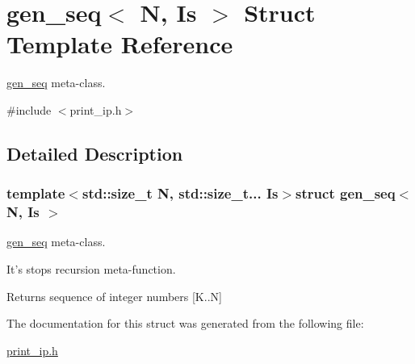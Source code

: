 \hypertarget{structgen__seq}{\section{gen\-\_\-seq$<$ N, Is $>$ Struct Template Reference}
\label{structgen__seq}
}


\hyperlink{structgen__seq}{gen\-\_\-seq} meta-\/class.  




{\ttfamily \#include $<$print\-\_\-ip.\-h$>$}



\subsection{Detailed Description}
\subsubsection*{template$<$std\-::size\-\_\-t N, std\-::size\-\_\-t... Is$>$struct gen\-\_\-seq$<$ N, Is $>$}

\hyperlink{structgen__seq}{gen\-\_\-seq} meta-\/class. 

It's stops recursion meta-\/function. \begin{DoxyReturn}{Returns}
sequence of integer numbers \mbox{[}K..N\mbox{]} 
\end{DoxyReturn}


The documentation for this struct was generated from the following file\-:\begin{DoxyCompactItemize}
\item 
\hyperlink{print__ip_8h}{print\-\_\-ip.\-h}\end{DoxyCompactItemize}
